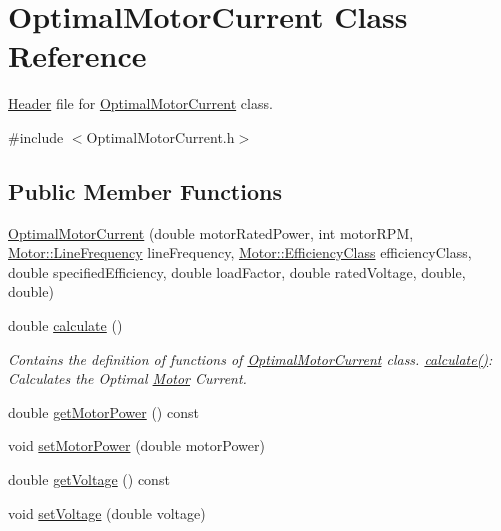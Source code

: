 \hypertarget{class_optimal_motor_current}{}\section{Optimal\+Motor\+Current Class Reference}
\label{class_optimal_motor_current}


\hyperlink{class_header}{Header} file for \hyperlink{class_optimal_motor_current}{Optimal\+Motor\+Current} class.  




{\ttfamily \#include $<$Optimal\+Motor\+Current.\+h$>$}

\subsection*{Public Member Functions}
\begin{DoxyCompactItemize}
\item 
\hyperlink{class_optimal_motor_current_a6e88ae5d7005b9790810de4f8892ba15}{Optimal\+Motor\+Current} (double motor\+Rated\+Power, int motor\+R\+PM, \hyperlink{class_motor_acee1bdf1b684ad36cb80dc2829d9fcee}{Motor\+::\+Line\+Frequency} line\+Frequency, \hyperlink{class_motor_afa022971ae062406a9f588c601673d4e}{Motor\+::\+Efficiency\+Class} efficiency\+Class, double specified\+Efficiency, double load\+Factor, double rated\+Voltage, double, double)
\item 
double \hyperlink{class_optimal_motor_current_af2dcf21026f526901ccf2927affecd49}{calculate} ()
\begin{DoxyCompactList}\small\item\em Contains the definition of functions of \hyperlink{class_optimal_motor_current}{Optimal\+Motor\+Current} class. \hyperlink{class_optimal_motor_current_af2dcf21026f526901ccf2927affecd49}{calculate()}\+: Calculates the Optimal \hyperlink{class_motor}{Motor} Current. \end{DoxyCompactList}\item 
double \hyperlink{class_optimal_motor_current_a345ae983be872a2504c50ff8a96b4fc9}{get\+Motor\+Power} () const
\item 
void \hyperlink{class_optimal_motor_current_a4950fe2e789f5c150648a846898aff74}{set\+Motor\+Power} (double motor\+Power)
\item 
double \hyperlink{class_optimal_motor_current_a4f9b5f8b83287868a72bfeca97713fd3}{get\+Voltage} () const
\item 
void \hyperlink{class_optimal_motor_current_a71dd261541b67b551e7053d3d6a35f6d}{set\+Voltage} (double voltage)
\end{DoxyCompactItemize}


